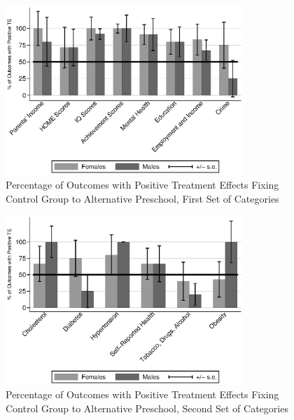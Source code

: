 \documentclass[static]{JJH-Beamer}
\begin{document}
\begin{frame}

\begin{figure}[H]
\caption{Percentage of Outcomes with Positive Treatment Effects Fixing Control Group to Alternative Preschool, First Set of Categories}
\begin{center}
\includegraphics[width=0.8\textwidth]{output/epan_ipw_p1_cats1}
\end{center}
\end{figure}

\end{frame}

\begin{frame}

\begin{figure}[H]
\caption{Percentage of Outcomes with Positive Treatment Effects Fixing Control Group to Alternative Preschool, Second Set of Categories}
\begin{center}
\includegraphics[width=0.8\textwidth]{output/epan_ipw_p1_cats2}
\end{center}
\end{figure}

\end{frame}
\end{document}
